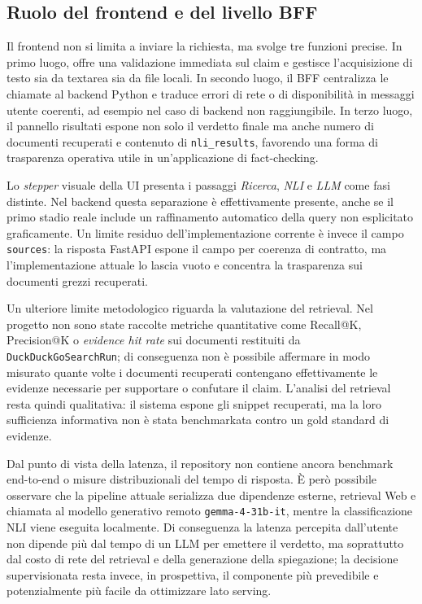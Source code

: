 \documentclass[10pt,a4paper]{article}
\begin{document}
\subsection{Ruolo del frontend e del livello BFF}

Il frontend non si limita a inviare la richiesta, ma svolge tre funzioni precise. In primo luogo, offre una validazione immediata sul claim e gestisce l'acquisizione di testo sia da textarea sia da file locali. In secondo luogo, il BFF centralizza le chiamate al backend Python e traduce errori di rete o di disponibilità in messaggi utente coerenti, ad esempio nel caso di backend non raggiungibile. In terzo luogo, il pannello risultati espone non solo il verdetto finale ma anche numero di documenti recuperati e contenuto di \texttt{nli\_results}, favorendo una forma di trasparenza operativa utile in un'applicazione di fact-checking.

Lo \textit{stepper} visuale della UI presenta i passaggi \textit{Ricerca}, \textit{NLI} e \textit{LLM} come fasi distinte. Nel backend questa separazione è effettivamente presente, anche se il primo stadio reale include un raffinamento automatico della query non esplicitato graficamente. Un limite residuo dell'implementazione corrente è invece il campo \texttt{sources}: la risposta FastAPI espone il campo per coerenza di contratto, ma l'implementazione attuale lo lascia vuoto e concentra la trasparenza sui documenti grezzi recuperati.

Un ulteriore limite metodologico riguarda la valutazione del retrieval. Nel progetto non sono state raccolte metriche quantitative come Recall@K, Precision@K o \textit{evidence hit rate} sui documenti restituiti da \texttt{DuckDuckGoSearchRun}; di conseguenza non è possibile affermare in modo misurato quante volte i documenti recuperati contengano effettivamente le evidenze necessarie per supportare o confutare il claim. L'analisi del retrieval resta quindi qualitativa: il sistema espone gli snippet recuperati, ma la loro sufficienza informativa non è stata benchmarkata contro un gold standard di evidenze.

Dal punto di vista della latenza, il repository non contiene ancora benchmark end-to-end o misure distribuzionali del tempo di risposta. È però possibile osservare che la pipeline attuale serializza due dipendenze esterne, retrieval Web e chiamata al modello generativo remoto \texttt{gemma-4-31b-it}, mentre la classificazione NLI viene eseguita localmente. Di conseguenza la latenza percepita dall'utente non dipende più dal tempo di un LLM per emettere il verdetto, ma soprattutto dal costo di rete del retrieval e della generazione della spiegazione; la decisione supervisionata resta invece, in prospettiva, il componente più prevedibile e potenzialmente più facile da ottimizzare lato serving.
\end{document}
